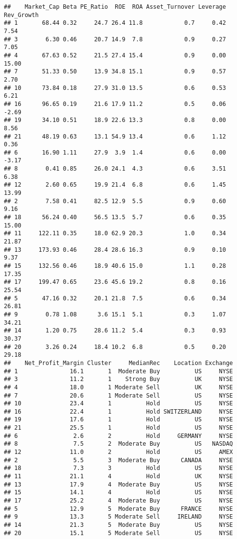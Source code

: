 \documentclass[
]{article}
\begin{document}
\begin{verbatim}
##    Market_Cap Beta PE_Ratio  ROE  ROA Asset_Turnover Leverage Rev_Growth
## 1       68.44 0.32     24.7 26.4 11.8            0.7     0.42       7.54
## 3        6.30 0.46     20.7 14.9  7.8            0.9     0.27       7.05
## 4       67.63 0.52     21.5 27.4 15.4            0.9     0.00      15.00
## 7       51.33 0.50     13.9 34.8 15.1            0.9     0.57       2.70
## 10      73.84 0.18     27.9 31.0 13.5            0.6     0.53       6.21
## 16      96.65 0.19     21.6 17.9 11.2            0.5     0.06      -2.69
## 19      34.10 0.51     18.9 22.6 13.3            0.8     0.00       8.56
## 21      48.19 0.63     13.1 54.9 13.4            0.6     1.12       0.36
## 6       16.90 1.11     27.9  3.9  1.4            0.6     0.00      -3.17
## 8        0.41 0.85     26.0 24.1  4.3            0.6     3.51       6.38
## 12       2.60 0.65     19.9 21.4  6.8            0.6     1.45      13.99
## 2        7.58 0.41     82.5 12.9  5.5            0.9     0.60       9.16
## 18      56.24 0.40     56.5 13.5  5.7            0.6     0.35      15.00
## 11     122.11 0.35     18.0 62.9 20.3            1.0     0.34      21.87
## 13     173.93 0.46     28.4 28.6 16.3            0.9     0.10       9.37
## 15     132.56 0.46     18.9 40.6 15.0            1.1     0.28      17.35
## 17     199.47 0.65     23.6 45.6 19.2            0.8     0.16      25.54
## 5       47.16 0.32     20.1 21.8  7.5            0.6     0.34      26.81
## 9        0.78 1.08      3.6 15.1  5.1            0.3     1.07      34.21
## 14       1.20 0.75     28.6 11.2  5.4            0.3     0.93      30.37
## 20       3.26 0.24     18.4 10.2  6.8            0.5     0.20      29.18
##    Net_Profit_Margin Cluster     MedianRec    Location Exchange
## 1               16.1       1  Moderate Buy          US     NYSE
## 3               11.2       1    Strong Buy          UK     NYSE
## 4               18.0       1 Moderate Sell          UK     NYSE
## 7               20.6       1 Moderate Sell          US     NYSE
## 10              23.4       1          Hold          US     NYSE
## 16              22.4       1          Hold SWITZERLAND     NYSE
## 19              17.6       1          Hold          US     NYSE
## 21              25.5       1          Hold          US     NYSE
## 6                2.6       2          Hold     GERMANY     NYSE
## 8                7.5       2  Moderate Buy          US   NASDAQ
## 12              11.0       2          Hold          US     AMEX
## 2                5.5       3  Moderate Buy      CANADA     NYSE
## 18               7.3       3          Hold          US     NYSE
## 11              21.1       4          Hold          UK     NYSE
## 13              17.9       4  Moderate Buy          US     NYSE
## 15              14.1       4          Hold          US     NYSE
## 17              25.2       4  Moderate Buy          US     NYSE
## 5               12.9       5  Moderate Buy      FRANCE     NYSE
## 9               13.3       5 Moderate Sell     IRELAND     NYSE
## 14              21.3       5  Moderate Buy          US     NYSE
## 20              15.1       5 Moderate Sell          US     NYSE
\end{verbatim}
\end{document}
